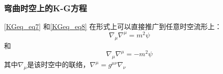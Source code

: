 \subsubsection{弯曲时空上的K-G方程}

\autoref{KGeq_eq7} 和\autoref{KGeq_eq8} 在形式上可以直接推广到任意时空流形上：
\begin{equation}
\nabla_\mu\nabla^\mu=m^2\psi
\end{equation}
和
\begin{equation}
\nabla_\mu\nabla^\mu=-m^2\psi
\end{equation}
其中$\nabla_\mu$是该时空中的联络，$\nabla^\mu=g^{\mu\nu}\nabla_\nu$
















